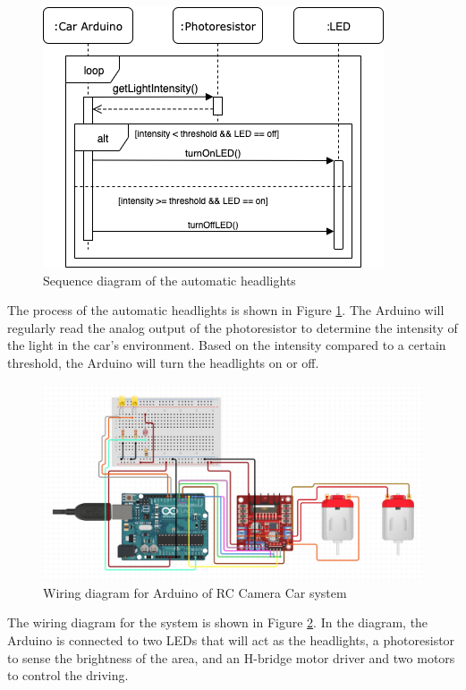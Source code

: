\documentclass[letterpaper,12pt]{report}
\begin{document}
	\begin{figure}[H]
    	\centering
		\includegraphics[width=0.75\linewidth]{Proposal_Automatic_Headlights_Sequence.png}
    	\caption{Sequence diagram of the automatic headlights}
    	\label{fig:headlights}
	\end{figure}

	The process of the automatic headlights is shown in Figure
	\ref{fig:headlights}. The Arduino will regularly read the analog output of
	the photoresistor to determine the intensity of the light in the car's
	environment. Based on the intensity compared to a certain threshold, the
	Arduino will turn the headlights on or off.

	\begin{figure}[H]
    	\centering
		\includegraphics[width=\linewidth]{Proposal_Wiring_Diagram.png}
    	\caption{Wiring diagram for Arduino of RC Camera Car system}
    	\label{fig:wiring}
	\end{figure}

	The wiring diagram for the system is shown in Figure \ref{fig:wiring}. In
	the diagram, the Arduino is connected to two LEDs that will act as the
	headlights, a photoresistor to sense the brightness of the area, and an
	H-bridge motor driver and two motors to control the driving.
\end{document}
